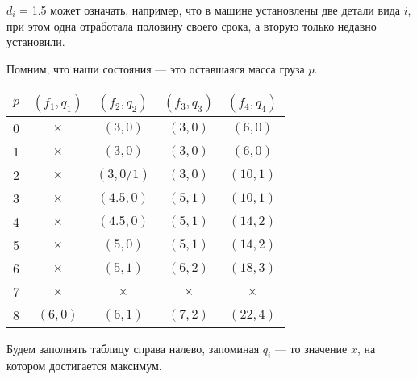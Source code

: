 $d_i$ = 1.5 может означать, например, что в машине установлены две детали вида $i$, при этом одна отработала половину своего срока, а вторую только недавно установили.

Помним, что наши состояния --- это оставшаяся масса груза $p$.

\begin{table}[h!]
	\centering
	\begin{tabular}{ | c | c | c | c | c | } 
		\hline
		$p$ & $(f_1, q_1)$ & $(f_2, q_2)$ & $(f_3, q_3)$ & $(f_4, q_4)$ \\ 
		\hline
		0 & $\times$ & $(3, 0)$   & $(3, 0)$ & $(6, 0)$ \\\hline
		1 & $\times$ & $(3, 0)$   & $(3, 0)$ & $(6, 0)$ \\\hline
		2 & $\times$ & $(3, 0/1)$ & $(3, 0)$ & $(10, 1)$ \\\hline
		3 & $\times$ & $(4.5, 0)$ & $(5, 1)$ & $(10, 1)$ \\\hline
		4 & $\times$ & $(4.5, 0)$ & $(5, 1)$ & $(14, 2)$ \\\hline
		5 & $\times$ & $(5, 0)$   & $(5, 1)$ & $(14, 2)$ \\\hline
		6 & $\times$ & $(5, 1)$   & $(6, 2)$ & $(18, 3)$ \\\hline
		7 & $\times$ & $\times$   & $\times$ & $\times$ \\\hline
		8 & $(6, 0)$ & $(6, 1)$   & $(7, 2)$ & $(22, 4)$ \\\hline
	\end{tabular}
\end{table}

Будем заполнять таблицу справа налево, запоминая $q_i$ --- то значение $x$, на котором достигается максимум.

